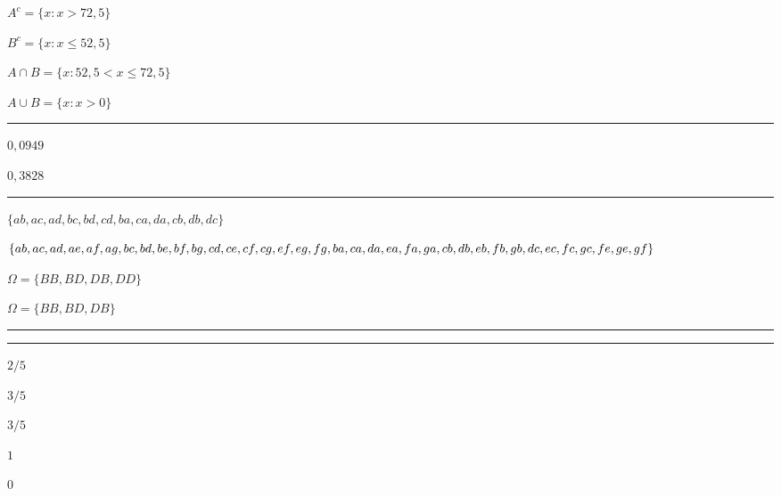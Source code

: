 \documentclass[a4paper,11pt,fleqn]{article}\usepackage[]{graphicx}\usepackage[]{color}
\theoremstyle{definition}
\begin{document}
\begin{compactenum}
\item
  \begin{inparaenum}
  \item $A^{c} = \{x : x > 72,5\}$ \,
  \item $B^{c} = \{x : x \leq 52,5\}$ \,
  \item $A \cap B = \{x : 52,5 < x \leq 72,5\}$ \,
  \item $A \cup B = \{x : x > 0\}$
  \end{inparaenum}

\vspace{0.3cm}
\hrule
\vspace{0.3cm}

\item
  \begin{inparaenum}
  \item $0,0949$
  \item $0,3828$
  \end{inparaenum}

\vspace{0.3cm}
\hrule
\vspace{0.3cm}

\item
  \begin{compactenum}
  \item $\{ab, ac, ad, bc, bd, cd, ba, ca, da, cb, db, dc\}$
  \item $\{ab, ac, ad, ae, af, ag, bc, bd, be, bf, bg, cd, ce, cf, cg,
    ef, eg, fg, ba, ca, da, ea, fa, ga, cb, db, eb, \\ fb, gb, dc, ec, fc,
    gc, fe, ge, gf\}$
  \item $\Omega = \{BB, BD, DB, DD\}$
  \item $\Omega = \{BB, BD, DB\}$
  \end{compactenum}

\vspace{0.3cm}
\hrule
\vspace{0.3cm}

\clearpage

\vspace{0.3cm}
\hrule
\vspace{0.3cm}

\item
  \begin{inparaenum}
  \item $2/5$ \,
  \item $3/5$ \,
  \item $3/5$ \,
  \item $1$ \,
  \item $0$
  \end{inparaenum}


\end{compactenum}
\end{document}
